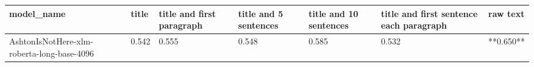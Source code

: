 \begin{tabular}{lllllll}
\toprule
                                model\_name & title & title and first paragraph & title and 5 sentences & title and 10 sentences & title and first sentence each paragraph &  raw text \\
\midrule
AshtonIsNotHere-xlm-roberta-long-base-4096 & 0.542 &                     0.555 &                 0.548 &                  0.585 &                                   0.532 & **0.650** \\
\bottomrule
\end{tabular}
